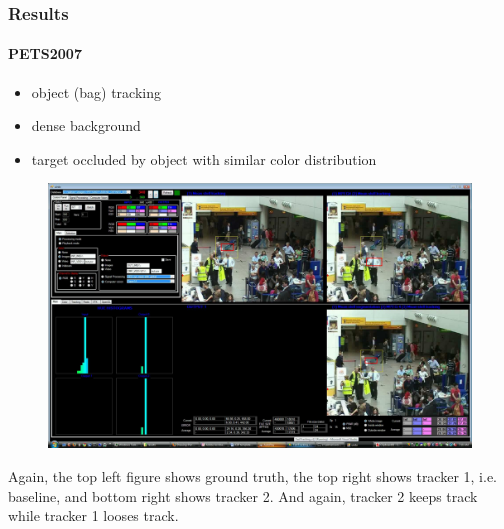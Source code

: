 \begin{frame}
\frametitle{Results}
\framesubtitle{PETS2007}
\logoCSIPCPL\mypagenum 
{}
{
	\begin{itemize}
		\item object (bag) tracking
		\item dense background
		\item target occluded by object with similar color distribution
	\end{itemize}
	\begin{figure}
		\includegraphics[width=1.0\textwidth]{figs/ICIP2009_PETS2007_FN_00340_snapshotVVG.pdf}
	\end{figure}
}
{
Again, the top left figure shows ground truth, the top right shows tracker 1, i.e. baseline, and bottom right shows tracker 2.  And again, tracker 2 keeps track while tracker 1 looses track.
}
\end{frame}









